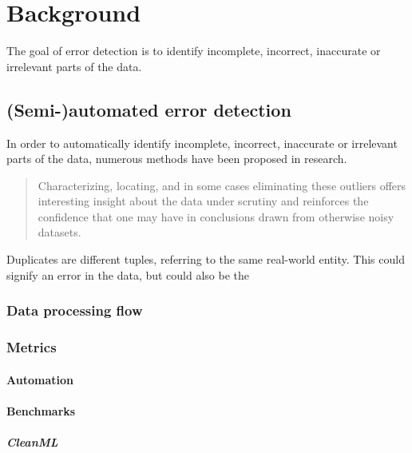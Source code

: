 \chapter{Background}
\label{chap:background}
The goal of error detection is to identify incomplete, incorrect, inaccurate or irrelevant parts of the data.
\\
\section{(Semi-)automated error detection}
In order to automatically identify incomplete, incorrect, inaccurate or irrelevant parts of the data, numerous methods have been proposed in research. 

\blockquote{Characterizing,
locating, and in some cases eliminating these outliers offers
interesting insight about the data under scrutiny and reinforces
the confidence that one may have in conclusions drawn from
otherwise noisy datasets. \cite{Pit--Claudel2016-dj}}

Duplicates are different tuples, referring to the same real-world entity. This could signify an error in the data, but could also be the 





\subsection{Data processing flow}

\subsection{Metrics}
\subsubsection{Automation}

\subsubsection{Benchmarks}
\paragraph{CleanML} 

